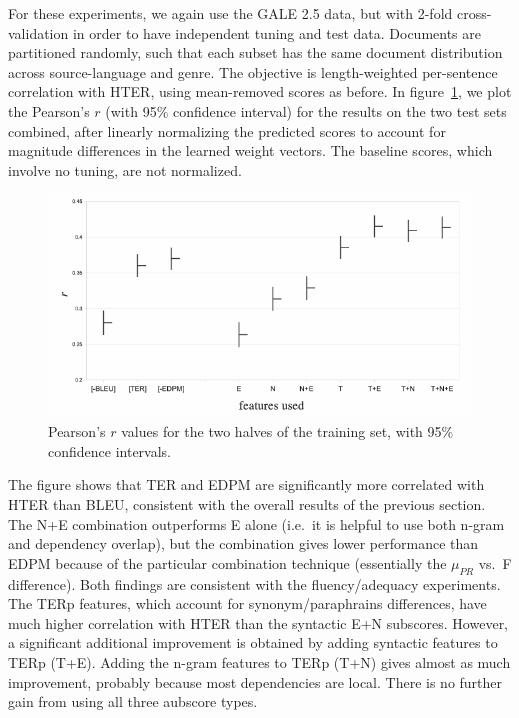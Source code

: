 \documentclass{kluwer}    %
\begin{document}
\begin{article}
For these experiments, we again use the GALE 2.5 data, but with 2-fold
cross-validation in order to have independent tuning and test data.
Documents are partitioned randomly, such that each subset has the same
document distribution across source-language and genre. The objective
is length-weighted per-sentence correlation with HTER, using
mean-removed scores as before. In figure~\ref{fig:tuneresults}, we
plot the Pearson's $r$ (with 95\% confidence interval) for the results
on the two test sets combined, after linearly normalizing the
predicted scores to account for magnitude differences in the learned
weight vectors.  The baseline scores, which involve no tuning, are not
normalized.

\begin{figure}
  \begin{center}
    \includegraphics[scale=0.45]{tuning}
  \end{center}
  \caption{Pearson's $r$ values for the two halves of the training
    set, with 95\% confidence intervals. }
  \label{fig:tuneresults}
\end{figure}

The figure shows that TER and EDPM are significantly more correlated with HTER than BLEU, consistent with the overall results of the previous section. The N+E combination outperforms E alone (i.e.\ it is helpful to use both n-gram and dependency overlap), but the combination gives lower performance than EDPM because of the particular combination technique (essentially the $\mu_{PR}$ vs.\ F difference). Both findings are consistent with the fluency/adequacy experiments. The TERp features, which account for synonym/paraphrains differences, have much higher correlation with HTER than the syntactic E+N subscores.  However, a significant additional improvement is obtained by adding syntactic features to TERp (T+E). Adding the n-gram features to TERp (T+N) gives almost as much improvement, probably because most dependencies are local.  There is no further gain from using all three aubscore types.


\end{article}
\end{document}

